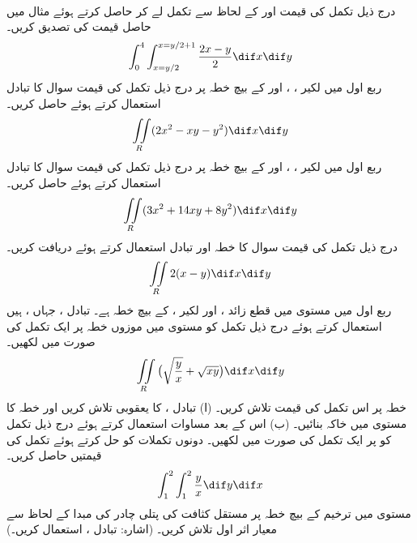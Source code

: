 \\
درج ذیل تکمل کی قیمت    اور  کے لحاظ سے تکمل  لے کر حاصل کرتے ہوئے  مثال  میں حاصل قیمت  کی تصدیق  کریں۔
 \begin{align*}
\int_0^4\int_{x=y/2}^{x=y/2+1}\frac{2x-y}{2}\dif x\dif y
\end{align*}
ربع اول میں  لکیر ، ،  اور  کے بیچ  خطہ   پر درج ذیل تکمل کی قیمت سوال  کا تبادل استعمال کرتے ہوئے حاصل کریں۔
\[\iint\limits_R(2x^2-xy-y^2)\dif x\dif y\]
ربع اول میں  لکیر ،    ،  اور  کے بیچ  خطہ    پر درج ذیل تکمل کی قیمت سوال  کا تبادل استعمال کرتے ہوئے حاصل کریں۔
\[\iint\limits_R(3x^2+14xy+8y^2)\dif x\dif y\]
درج ذیل تکمل کی قیمت  سوال   کا  خطہ   اور تبادل استعمال کرتے ہوئے دریافت کریں۔
\[\iint\limits_R 2(x-y)\dif x\dif y\] 
ربع اول میں مستوی  میں  قطع زائد ،   اور لکیر ،  کے بیچ خطہ  ہے۔ تبادل ،  جہاں  ،  ہیں استعمال  کرتے ہوئے درج ذیل تکمل کو  مستوی    میں موزوں خطہ  پر ایک  تکمل کی صورت میں  لکھیں۔
\[\iint\limits_R \big(\sqrt{\frac{y}{x}}+\sqrt{xy}\big)\dif x\dif y\]
خطہ  پر اس  تکمل کی قیمت تلاش کریں۔
(ا)  تبادل ،  کا یعقوبی تلاش کریں اور خطہ  کا  مستوی  میں  خاکہ بنائیں۔ (ب) اس کے بعد مساوات  استعمال کرتے ہوئے درج ذیل تکمل  کو   پر ایک تکمل کی صورت میں لکھیں۔ دونوں تکملات کو حل کرتے ہوئے تکمل کی قیمتیں حاصل کریں۔
\[\int_1^2\int_1^2\frac{y}{x}\dif y\dif x\]
مستوی  میں ترخیم  کے بیچ خطہ پر مستقل کثافت کی پتلی چادر  کی مبدا کے لحاظ سے  معیار  اثر اول  تلاش کریں۔ (اشارہ: تبادل ،  استعمال کریں۔)
